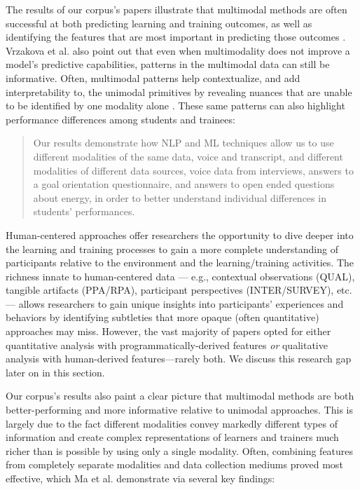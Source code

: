 \documentclass[manuscript,screen,review]{acmart}
\begin{document}
The results of our corpus's papers illustrate that multimodal methods are often successful at both predicting learning and training outcomes, as well as identifying the features that are most important in predicting those outcomes \cite{3339002981,1637690235,3783339081}. Vrzakova et al. also point out that even when multimodality does not improve a model's predictive capabilities, patterns in the multimodal data can still be informative. Often, multimodal patterns help contextualize, and add interpretability to, the unimodal primitives by revealing nuances that are unable to be identified by one modality alone \cite{1770989706}. These same patterns can also highlight performance differences among students and trainees:

\begin{quote}
    Our results demonstrate how NLP and ML techniques allow us to use different modalities of the same data, voice and transcript, and different modalities of different data sources, voice data from interviews, answers to a goal orientation questionnaire, and answers to open ended questions about energy, in order to better understand individual differences in students’ performances. \cite{32184286}
\end{quote}

Human-centered approaches offer researchers the opportunity to dive deeper into the learning and training processes to gain a more complete understanding of participants relative to the environment and the learning/training activities. The richness innate to human-centered data --- e.g., contextual observations (QUAL), tangible artifacts (PPA/RPA), participant perspectives (INTER/SURVEY), etc. --- allows researchers to gain unique insights into participants' experiences and behaviors by identifying subtleties that more opaque (often quantitative) approaches may miss. However, the vast majority of papers opted for either quantitative analysis with programmatically-derived features \textit{or} qualitative analysis with human-derived features---rarely both. We discuss this research gap later on in this section.

Our corpus's results also paint a clear picture that multimodal methods are both better-performing and more informative relative to unimodal approaches. This is largely due to the fact different modalities convey markedly different types of information and create complex representations of learners and trainers much richer than is possible by using only a single modality. Often, combining features from completely separate modalities and data collection mediums proved most effective, which Ma et al. \cite{3754172825} demonstrate via several key findings:
\end{document}

